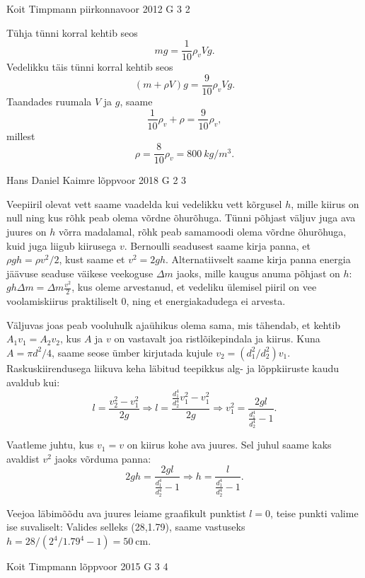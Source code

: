 \documentclass[11pt]{article}
\begin{document}
{%
{Koit Timpmann} %
{piirkonnavoor} %
{2012} %
{G 3} %
{2} %
{

\ifSolution
Tühja tünni korral kehtib seos
\[
mg=\frac 1{10}\rho_vVg.
\]
Vedelikku täis tünni korral kehtib seos	
\[
(m+\rho V)g=\frac 9{10}\rho_vVg.
\]
Taandades ruumala $V$ ja $g$, saame
\[
\frac 1{10}\rho_v+\rho=\frac 9{10}\rho_v,
\]
millest 
\[
\rho=\frac 8{10}\rho_v = \SI{800}{kg/m^3}.
\]
\fi
}

{Hans Daniel Kaimre} %
{lõppvoor} %
{2018} %
{G 2} %
{3} %
{

\ifSolution
Veepiiril olevat vett saame vaadelda kui vedelikku vett kõrgusel $h$, mille kiirus on null ning kus rõhk peab olema võrdne õhurõhuga. Tünni põhjast väljuv juga ava juures on $h$ võrra madalamal, rõhk peab samamoodi olema võrdne õhurõhuga, kuid juga liigub kiirusega $v$. Bernoulli seadusest saame kirja panna, et $\rho g h = \rho v^2/2$, kust saame et $v^2=2gh$. Alternatiivselt saame kirja panna energia jäävuse seaduse väikese veekoguse $\Delta m$ jaoks, mille kaugus anuma põhjast on $h$: $ g h \Delta m = \Delta m \frac{v^2}{2}$, kus oleme arvestanud, et vedeliku ülemisel piiril on vee voolamiskiirus praktiliselt 0, ning et energiakadudega ei arvesta. 

Väljuvas joas peab vooluhulk ajaühikus olema sama, mis tähendab, et kehtib $A_1v_1=A_2v_2$, kus $A$ ja $v$ on vastavalt joa ristlõikepindala ja kiirus. Kuna $A=\pi d^2/4$, saame seose ümber kirjutada kujule $v_2=(d_1^2/d_2^2)v_1$. Raskuskiirendusega liikuva keha läbitud teepikkus alg- ja lõppkiiruste kaudu avaldub kui:
$$l=\frac{v_2^2-v_1^2}{2g} \Rightarrow l=\frac{\frac{d_1^4}{d_2^4}v_1^2-v_1^2}{2g} \Rightarrow v_1^2=\frac{2gl}{\frac{d_1^4}{d_2^4}-1}.$$

Vaatleme juhtu, kus $v_1=v$ on kiirus kohe ava juures. Sel juhul saame kaks avaldist $v^2$ jaoks võrduma panna:
$$2gh=\frac{2gl}{\frac{d_1^4}{d_2^4}-1}\Rightarrow h=\frac{l}{\frac{d_1^4}{d_2^4}-1}.$$

Veejoa läbimõõdu ava juures leiame graafikult punktist $l=0$, teise punkti valime ise suvaliselt: Valides selleks (28,\num{1.79}), saame vastuseks $h=28/(2^4/\num{1.79}^4-1)=\SI{50}{\cm}$.
\fi
}

{Koit Timpmann} %
{lõppvoor} %
{2015} %
{G 3} %
{4} %
{

}}
\end{document}
